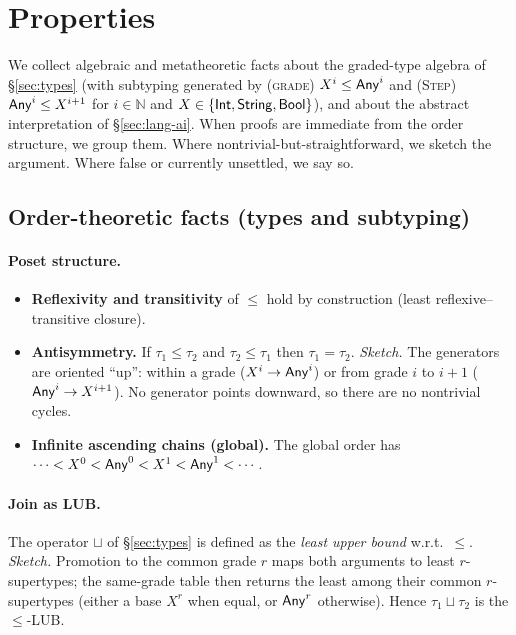 \section{Properties}
\label{sec:properties}

We collect algebraic and metatheoretic facts about the graded-type algebra of \S\ref{sec:types}
(with subtyping generated by \textsc{(grade)} $X^{i}\le \mathsf{Any}^{i}$ and \textsc{(Step)} $\mathsf{Any}^{i}\le X^{i+1}$ for $i\in\mathbb{N}$ and $X\in\{\mathsf{Int},\mathsf{String},\mathsf{Bool}\}$),
and about the abstract interpretation of \S\ref{sec:lang-ai}.
When proofs are immediate from the order structure, we group them.
Where nontrivial-but-straightforward, we sketch the argument.
Where false or currently unsettled, we say so.

\subsection{Order-theoretic facts (types and subtyping)}

\paragraph{Poset structure.}
\begin{itemize}
\item \textbf{Reflexivity and transitivity} of $\le$ hold by construction (least reflexive–transitive closure).
\item \textbf{Antisymmetry.} If $\tau_1\le \tau_2$ and $\tau_2\le \tau_1$ then $\tau_1=\tau_2$.
\emph{Sketch.} The generators are oriented ``up'': within a grade ($X^{i}\to\mathsf{Any}^{i}$) or from grade $i$ to $i{+}1$ ($\mathsf{Any}^{i}\to X^{i+1}$). No generator points downward, so there are no nontrivial cycles.
\item \textbf{Infinite ascending chains (global).} The global order has $\cdots < X^{0} < \mathsf{Any}^{0} < X^{1} < \mathsf{Any}^{1} < \cdots$.
\end{itemize}

\paragraph{Join as LUB.}
The operator $\sqcup$ of \S\ref{sec:types} is defined as the \emph{least upper bound} w.r.t.\ $\le$.
\emph{Sketch.} Promotion to the common grade $r$ maps both arguments to least $r$-supertypes; the same-grade table then returns the least among their common $r$-supertypes (either a base $X^{r}$ when equal, or $\mathsf{Any}^{r}$ otherwise). Hence $\tau_1\sqcup\tau_2$ is the $\le$-LUB.

